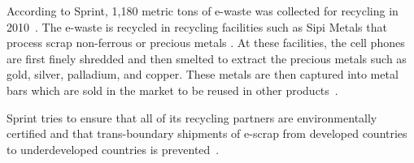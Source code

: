 According to Sprint, 1,180 metric tons of e-waste was collected for recycling in 2010~\cite{sprintpolicy-url}. The e-waste is recycled in recycling facilities such as Sipi Metals that process scrap non-ferrous or precious metals . At these facilities, the cell phones are first finely shredded and then smelted to extract the precious metals such as gold, silver, palladium, and copper. These metals are then captured into metal bars which are sold in the market to be reused in other products~\cite{sprintrecycle-url}. 

Sprint tries to ensure that all of its recycling partners are environmentally certified and that trans-boundary shipments of e-scrap from developed countries to underdeveloped countries is prevented~\cite{sprintpolicy-url}.

